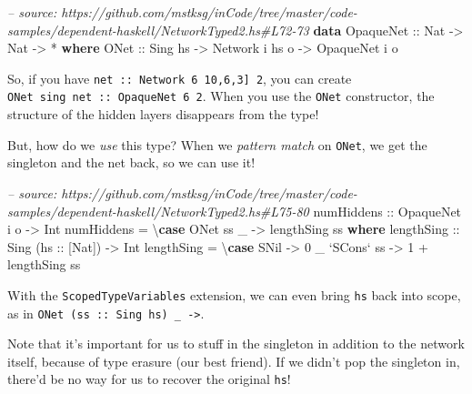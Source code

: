 \documentclass[]{article}
\newenvironment{Shaded}{}{}
\newcommand{\KeywordTok}[1]{\textcolor[rgb]{0.00,0.44,0.13}{\textbf{{#1}}}}
\newcommand{\DataTypeTok}[1]{\textcolor[rgb]{0.56,0.13,0.00}{{#1}}}
\newcommand{\DecValTok}[1]{\textcolor[rgb]{0.25,0.63,0.44}{{#1}}}
\newcommand{\CommentTok}[1]{\textcolor[rgb]{0.38,0.63,0.69}{\textit{{#1}}}}
\newcommand{\OtherTok}[1]{\textcolor[rgb]{0.00,0.44,0.13}{{#1}}}
\newcommand{\FunctionTok}[1]{\textcolor[rgb]{0.02,0.16,0.49}{{#1}}}
\newcommand{\NormalTok}[1]{{#1}}
\begin{document}
\begin{Shaded}
\begin{Highlighting}[]
\CommentTok{-- source: https://github.com/mstksg/inCode/tree/master/code-samples/dependent-haskell/NetworkTyped2.hs#L72-73}
\KeywordTok{data} \DataTypeTok{OpaqueNet}\OtherTok{ ::} \DataTypeTok{Nat} \OtherTok{->} \DataTypeTok{Nat} \OtherTok{->} \FunctionTok{*} \KeywordTok{where}
    \DataTypeTok{ONet}\OtherTok{ ::} \DataTypeTok{Sing} \NormalTok{hs }\OtherTok{->} \DataTypeTok{Network} \NormalTok{i hs o }\OtherTok{->} \DataTypeTok{OpaqueNet} \NormalTok{i o}
\end{Highlighting}
\end{Shaded}

So, if you have \texttt{net\ ::\ Network\ 6\ \textquotesingle{}{[}10,6,3{]}\ 2},
you can create \texttt{ONet\ sing\ net\ ::\ OpaqueNet\ 6\ 2}. When you use the
\texttt{ONet} constructor, the structure of the hidden layers disappears from
the type!

But, how do we \emph{use} this type? When we \emph{pattern match} on
\texttt{ONet}, we get the singleton and the net back, so we can use it!

\begin{Shaded}
\begin{Highlighting}[]
\CommentTok{-- source: https://github.com/mstksg/inCode/tree/master/code-samples/dependent-haskell/NetworkTyped2.hs#L75-80}
\OtherTok{numHiddens ::} \DataTypeTok{OpaqueNet} \NormalTok{i o }\OtherTok{->} \DataTypeTok{Int}
\NormalTok{numHiddens }\FunctionTok{=} \NormalTok{\textbackslash{}}\KeywordTok{case} \DataTypeTok{ONet} \NormalTok{ss _ }\OtherTok{->} \NormalTok{lengthSing ss}
  \KeywordTok{where}
\OtherTok{    lengthSing ::} \DataTypeTok{Sing} \NormalTok{(}\OtherTok{hs ::} \NormalTok{[}\DataTypeTok{Nat}\NormalTok{]) }\OtherTok{->} \DataTypeTok{Int}
    \NormalTok{lengthSing }\FunctionTok{=} \NormalTok{\textbackslash{}}\KeywordTok{case} \DataTypeTok{SNil}         \OtherTok{->} \DecValTok{0}
                       \NormalTok{_ }\OtherTok{`SCons`} \NormalTok{ss }\OtherTok{->} \DecValTok{1} \FunctionTok{+} \NormalTok{lengthSing ss}
\end{Highlighting}
\end{Shaded}

With the \texttt{ScopedTypeVariables} extension, we can even bring \texttt{hs}
back into scope, as in \texttt{ONet\ (ss\ ::\ Sing\ hs)\ \_\ -\textgreater{}}.

Note that it's important for us to stuff in the singleton in addition to the
network itself, because of type erasure (our best friend). If we didn't pop the
singleton in, there'd be no way for us to recover the original \texttt{hs}!
\end{document}
